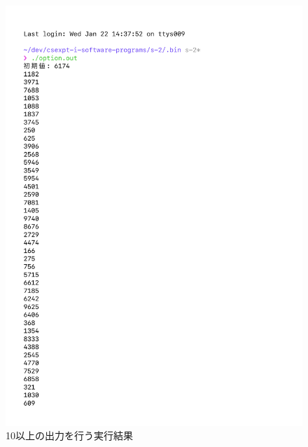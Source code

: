 % 
\begin{figure}[H]
    \centering
    \includegraphics[width=0.8\hsize, pagebox=mediabox, page=1]{option_result.pdf}
    \caption{10以上の出力を行う実行結果}
    \label{10以上の出力を行う実行結果}
\end{figure}
